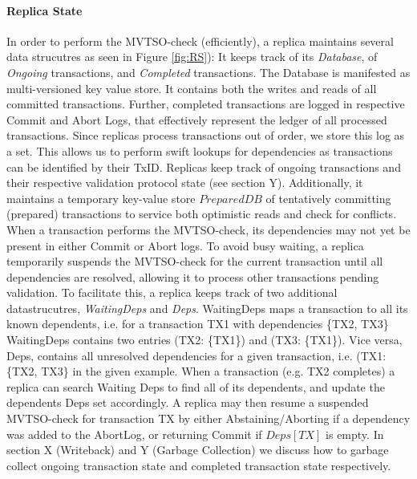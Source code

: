 \paragraph{Replica State}
In order to perform the MVTSO-check (efficiently), a replica maintains several data strucutres as seen in Figure \ref{fig:RS}): It keeps track of its \textit{Database}, of \textit{Ongoing} transactions, and \textit{Completed} transactions. The Database is manifested as multi-versioned key value store. It contains both the writes and reads of all committed transactions.
Further, completed transactions are logged in respective Commit and Abort Logs, that effectively represent the ledger of all processed transactions. Since replicas process transactions out of order, we store this log as a set. This allows us to perform swift lookups for dependencies as transactions can be identified by their TxID. 
Replicas keep track of ongoing transactions and their respective validation protocol state (see section Y). Additionally, it maintains a temporary key-value store $PreparedDB$ of tentatively committing (prepared) transactions to service both optimistic reads and check for conflicts. 
When a transaction performs the MVTSO-check, its dependencies may not yet be present in either Commit or Abort logs. To avoid busy waiting, a replica temporarily suspends the MVTSO-check for the current transaction until all dependencies are resolved, allowing it to process other transactions pending validation. To facilitate this, a replica keeps track of two additional datastrucutres, \textit{WaitingDeps} and \textit{Deps}. WaitingDeps maps a transaction to all its known dependents, i.e. for a transaction TX1 with dependencies \{TX2, TX3\} WaitingDeps contains two entries (TX2: \{TX1\}) and (TX3: \{TX1\}). Vice versa, Deps, contains all unresolved dependencies for a given transaction, i.e. (TX1: \{TX2, TX3\} in the given example. When a transaction (e.g. TX2 completes) a replica can search Waiting Deps to find all of its dependents, and update the dependents Deps set accordingly. A replica may then resume a suspended MVTSO-check for transaction TX by either Abstaining/Aborting if a dependency was added to the AbortLog, or returning Commit if $Deps[TX]$ is empty.
In section X (Writeback) and Y (Garbage Collection) we discuss how to garbage collect ongoing transaction state and completed transaction state respectively. 




